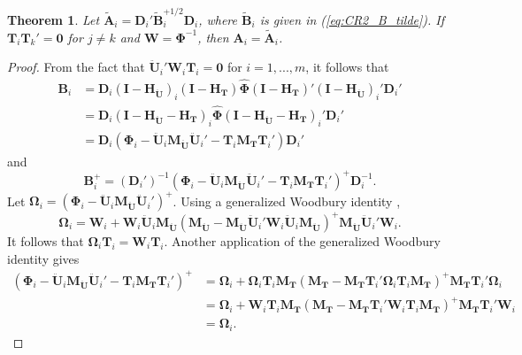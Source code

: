 \documentclass[12pt]{article}\usepackage[]{graphicx}\usepackage[]{color}
\newtheorem{thm}{Theorem}
\newcommand{\bm}{\mathbf}
\newcommand{\bs}{\boldsymbol}
\begin{document}
\begin{thm}
\label{thm:absorb}
Let $\bm{\tilde{A}}_i = \bm{D}_i'\bm{\tilde{B}}_i^{+1/2} \bm{D}_i$, where $\bm{\tilde{B}}_i$ is given in (\ref{eq:CR2_B_tilde}). If $\bm{T}_i \bm{T}_k' = \bm{0}$ for $j \neq k$ and $\bm{W} = \bs\Phi^{-1}$, then $\bm{A}_i = \bm{\tilde{A}}_i$. 
\end{thm}

\begin{proof}
From the fact that $\bm{\ddot{U}}_i'\bm{W}_i\bm{T}_i = \bm{0}$ for $i = 1,...,m$, it follows that \begin{align*}
\bm{B}_i &= \bm{D}_i \left(\bm{I} - \bm{H_{\ddot{U}}}\right)_i \left(\bm{I} - \bm{H_T}\right) \hat{\bs\Phi} \left(\bm{I} - \bm{H_T}\right)' \left(\bm{I} - \bm{H_{\ddot{U}}}\right)_i' \bm{D}_i'\\
&= \bm{D}_i \left(\bm{I} - \bm{H_{\ddot{U}}} - \bm{H_T}\right)_i \hat{\bs\Phi} \left(\bm{I} - \bm{H_{\ddot{U}}} - \bm{H_T}\right)_i' \bm{D}_i' \\
&= \bm{D}_i \left(\bs\Phi_i - \bm{\ddot{U}}_i \bm{M_{\ddot{U}}}\bm{\ddot{U}}_i' - \bm{T}_i \bm{M_T}\bm{T}_i'\right)\bm{D}_i'
\end{align*}
and 
\begin{equation}
\label{eq:B_i_inverse}
\bm{B}_i^+ = \left(\bm{D}_i'\right)^{-1} \left(\bs\Phi_i - \bm{\ddot{U}}_i \bm{M_{\ddot{U}}}\bm{\ddot{U}}_i' - \bm{T}_i \bm{M_T}\bm{T}_i'\right)^+ \bm{D}_i^{-1}.
\end{equation}
Let $\bs\Omega_i = \left(\bs\Phi_i - \bm{\ddot{U}}_i \bm{M_{\ddot{U}}}\bm{\ddot{U}}_i'\right)^+$.
Using a generalized Woodbury identity \citep{Henderson1981on}, \[
\bs\Omega_i = \bm{W}_i + \bm{W}_i \bm{\ddot{U}}_i \bm{M_{\ddot{U}}}\left(\bm{M_{\ddot{U}}} - \bm{M_{\ddot{U}}} \bm{\ddot{U}}_i' \bm{W}_i \bm{\ddot{U}}_i \bm{M_{\ddot{U}}}\right)^+ \bm{M_{\ddot{U}}}\bm{\ddot{U}}_i'\bm{W}_i. \]
It follows that $\bs\Omega_i \bm{T}_i = \bm{W}_i \bm{T}_i$. 
Another application of the generalized Woodbury identity gives 
\begin{align*}
\left(\bs\Phi_i - \bm{\ddot{U}}_i \bm{M_{\ddot{U}}}\bm{\ddot{U}}_i' - \bm{T}_i \bm{M_T}\bm{T}_i'\right)^+ &= \bs\Omega_i + \bs\Omega_i \bm{T}_i \bm{M_T}\left(\bm{M_T} - \bm{M_T}\bm{T}_i' \bs\Omega_i \bm{T}_i \bm{M_T}\right)^+ \bm{M_T} \bm{T}_i' \bs\Omega_i \\
&= \bs\Omega_i + \bm{W}_i \bm{T}_i \bm{M_T}\left(\bm{M_T} - \bm{M_T}\bm{T}_i' \bm{W}_i \bm{T}_i\bm{M_T}\right)^+ \bm{M_T} \bm{T}_i' \bm{W}_i \\
&= \bs\Omega_i.
\end{align*}

\end{proof}
\end{document}
